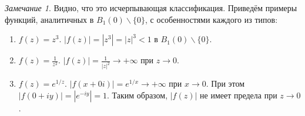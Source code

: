 \documentclass[12pt]{article}
\theoremstyle{thmnote}
\theoremstyle{remark}
\newtheorem*{remark}{Замечание}
\theoremstyle{defnote}
\begin{document}
\begin{remark}
    Видно, что это исчерпывающая классификация. Приведём примеры функций, аналитичных в $B_1(0) \backslash \{0\}$, с особенностями каждого из типов:
    \begin{enumerate}
        \item $f(z) = z^3$. $|f(z)| = |z^3| = |z|^3 < 1$ в $B_1(0) \backslash \{0\}$.
        \item $f(z) = \frac{1}{z^2}$. $|f(z)| = \frac{1}{|z|^2} \to +\infty$ при $z \to 0$.
        \item $f(z) = e^{1/z}$. $|f(x + 0i)| = e^{1/x} \to +\infty$ при $x \to 0$. При этом $|f(0 + iy)| = |e^{-iy}| = 1$. Таким образом, $|f(z)|$ не имеет предела при $z \to 0$.
    \end{enumerate}
\end{remark}
\end{document}
